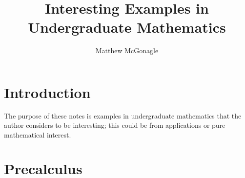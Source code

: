 \documentclass{article}
\title{Interesting Examples in Undergraduate Mathematics}
\author{Matthew McGonagle}
\begin{document}
\maketitle

\tableofcontents

\section{Introduction}

The purpose of these notes is examples in undergraduate mathematics that the author considers to be interesting; this could be from applications or pure mathematical interest. 

\section{Precalculus}








{}

\end{document}
